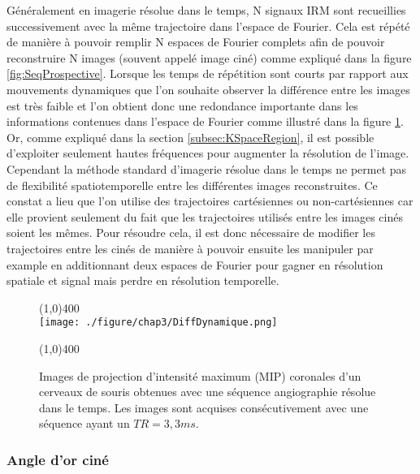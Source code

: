 Généralement en imagerie résolue dans le temps, N signaux IRM sont recueillies successivement avec la même trajectoire dans l'espace de Fourier. Cela est répété de manière à pouvoir remplir N espaces de Fourier complets afin de pouvoir reconstruire N images (souvent appelé image ciné) comme expliqué dans la figure \ref{fig:SeqProspective}. 
Lorsque les temps de répétition sont courts par rapport aux mouvements dynamiques que l'on souhaite observer la différence entre les images est très faible et l'on obtient donc une redondance importante dans les informations contenues dans l'espace de Fourier comme illustré dans la figure \ref{fig:DiffDynamique}. Or, comme expliqué dans la section \ref{subsec:KSpaceRegion}, il est possible d'exploiter seulement hautes fréquences pour augmenter la résolution de l'image.
Cependant la méthode standard d'imagerie résolue dans le temps ne permet pas de flexibilité spatiotemporelle entre les différentes images reconstruites. Ce constat a lieu que l'on utilise des trajectoires cartésiennes ou non-cartésiennes car elle provient seulement du fait que les trajectoires utilisés entre les images cinés soient les mêmes. Pour résoudre cela, il est donc nécessaire de modifier les trajectoires entre les cinés de manière à pouvoir ensuite les manipuler par example en additionnant deux espaces de Fourier pour gagner en résolution spatiale et signal mais perdre en résolution temporelle. 
\begin{figure}[H]
\centering \line(1,0){400} \\

\texttt{[image: ./figure/chap3/DiffDynamique.png]}
\caption[Différence entre des images de flux dynamique]{\label{fig:DiffDynamique}Images de projection d'intensité maximum (MIP) coronales d'un cerveaux de souris obtenues avec une séquence angiographie résolue dans le temps. Les images sont acquises consécutivement avec une séquence ayant un $TR = 3,3 ms$.}

\line(1,0){400} \\ \end{figure}

\subsubsection{Angle d'or ciné}

